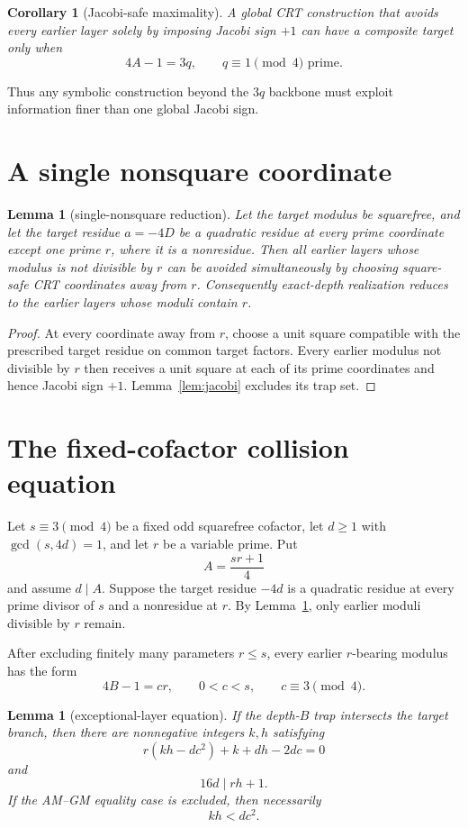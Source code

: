 \documentclass[11pt]{article}
\newtheorem{lemma}[theorem]{Lemma}
\newtheorem{corollary}[theorem]{Corollary}
\theoremstyle{definition}
\begin{document}
\begin{corollary}[Jacobi-safe maximality]\label{cor:jacmax}
A global CRT construction that avoids every earlier layer solely by imposing Jacobi sign $+1$ can have a composite target only when
\[
4A-1=3q,\qquad q\equiv1\pmod4\text{ prime}.
\]
\end{corollary}

Thus any symbolic construction beyond the $3q$ backbone must exploit information finer than one global Jacobi sign.

\section{A single nonsquare coordinate}
\begin{lemma}[single-nonsquare reduction]\label{lem:single}
Let the target modulus be squarefree, and let the target residue $a=-4D$ be a quadratic residue at every prime coordinate except one prime $r$, where it is a nonresidue. Then all earlier layers whose modulus is not divisible by $r$ can be avoided simultaneously by choosing square-safe CRT coordinates away from $r$. Consequently exact-depth realization reduces to the earlier layers whose moduli contain $r$.
\end{lemma}

\begin{proof}
At every coordinate away from $r$, choose a unit square compatible with the prescribed target residue on common target factors. Every earlier modulus not divisible by $r$ then receives a unit square at each of its prime coordinates and hence Jacobi sign $+1$. Lemma~\ref{lem:jacobi} excludes its trap set.
\end{proof}

\section{The fixed-cofactor collision equation}
Let $s\equiv3\pmod4$ be a fixed odd squarefree cofactor, let $d\ge1$ with $\gcd(s,4d)=1$, and let $r$ be a variable prime. Put
\[
A=\frac{sr+1}{4}
\]
and assume $d\mid A$. Suppose the target residue $-4d$ is a quadratic residue at every prime divisor of $s$ and a nonresidue at $r$. By Lemma~\ref{lem:single}, only earlier moduli divisible by $r$ remain.

After excluding finitely many parameters $r\le s$, every earlier $r$-bearing modulus has the form
\[
4B-1=cr,
\qquad 0<c<s,
\qquad c\equiv3\pmod4.
\]

\begin{lemma}[exceptional-layer equation]\label{lem:master}
If the depth-$B$ trap intersects the target branch, then there are nonnegative integers $k,h$ satisfying
\[
\boxed{r(kh-dc^2)+k+dh-2dc=0}
\]
and
\[
16d\mid rh+1.
\]
If the AM--GM equality case is excluded, then necessarily
\[
\boxed{kh<dc^2.}
\]
\end{lemma}
\end{document}
